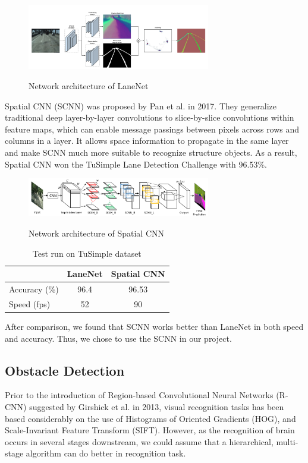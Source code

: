 \documentclass[runningheads]{llncs}
\begin{document}
\begin{figure}
    \centering
    \includegraphics[width=8cm]{reference/lanenet}
    \label{fig:LaneNet}
    \caption{Network architecture of LaneNet}
\end{figure}

Spatial CNN (SCNN) was proposed by Pan et al.
\cite{SpatialCNN} in 2017. They generalize traditional 
deep layer-by-layer convolutions to slice-by-slice 
convolutions within feature maps, which can enable message 
passings between pixels across rows and columns in a layer. 
It allows space information to propagate in the same layer 
and make SCNN much more suitable to recognize structure 
objects. As a result, Spatial CNN won the TuSimple Lane 
Detection Challenge with 96.53\%. 

\begin{figure}
    \centering
    \includegraphics[width=8cm]{reference/scnn}
    \label{fig:SCNN}
    \caption{Network architecture of Spatial CNN}
\end{figure}

\begin{table}[!htbp]
	\centering
	\begin{tabular}{|l|c|c|}
		\hline 
		&LaneNet&Spatial CNN\\
		\hline  
		Accuracy (\%)&96.4&96.53\\
		\hline  
		Speed (fps)&52&90\\
		\hline 
	\end{tabular}
	\caption{Test run on TuSimple dataset}
\end{table}

After comparison, we found that SCNN works better than 
LaneNet in both speed and accuracy. Thus, we chose to use 
the SCNN in our project. 


\subsection{Obstacle Detection}
Prior to the introduction of Region-based Convolutional 
Neural Networks (R-CNN) suggested by Girshick et al. 
\cite{RCNN} in 2013, visual recognition tasks has been 
based considerably on the use of Histograms of Oriented 
Gradients (HOG)\cite{HOG}, and Scale-Invariant Feature 
Transform (SIFT)\cite{SIFT}. However, as the recognition of 
brain occurs in several stages downstream, we could assume 
that a hierarchical, multi-stage algorithm can do better in 
recognition task. 
\end{document}
